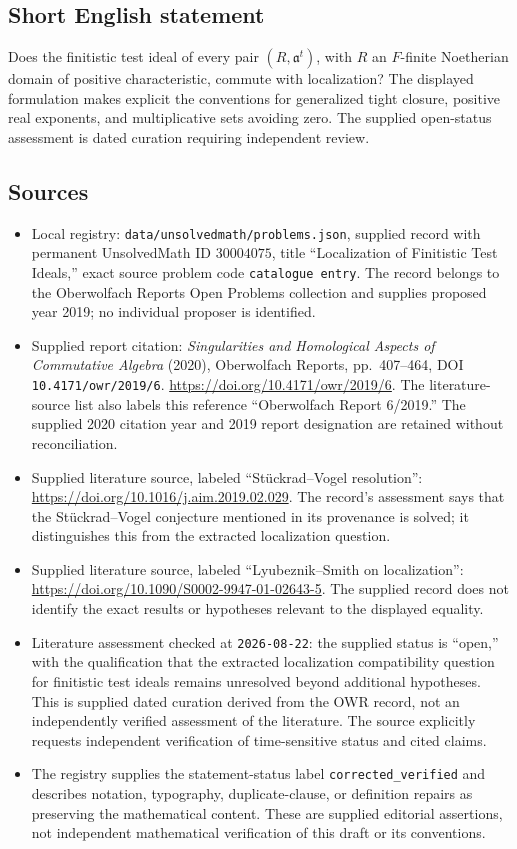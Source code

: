 \documentclass[11pt]{article}
\begin{document}
\subsection{Short English statement}
Does the finitistic test ideal of every pair \((R,\mathfrak a^t)\), with \(R\) an \(F\)-finite Noetherian domain of positive characteristic, commute with localization? The displayed formulation makes explicit the conventions for generalized tight closure, positive real exponents, and multiplicative sets avoiding zero. The supplied open-status assessment is dated curation requiring independent review.
\subsection{Sources}
\begin{itemize}
\item Local registry: \texttt{data/unsolvedmath/problems.json}, supplied record with permanent UnsolvedMath ID \(30004075\), title ``Localization of Finitistic Test Ideals,'' exact source problem code \texttt{catalogue entry}. The record belongs to the Oberwolfach Reports Open Problems collection and supplies proposed year 2019; no individual proposer is identified.
\item Supplied report citation: \emph{Singularities and Homological Aspects of Commutative Algebra} (2020), Oberwolfach Reports, pp.~407--464, DOI \texttt{10.4171/owr/2019/6}. \url{https://doi.org/10.4171/owr/2019/6}. The literature-source list also labels this reference ``Oberwolfach Report 6/2019.'' The supplied 2020 citation year and 2019 report designation are retained without reconciliation.
\item Supplied literature source, labeled ``St\"uckrad--Vogel resolution'': \url{https://doi.org/10.1016/j.aim.2019.02.029}. The record's assessment says that the St\"uckrad--Vogel conjecture mentioned in its provenance is solved; it distinguishes this from the extracted localization question.
\item Supplied literature source, labeled ``Lyubeznik--Smith on localization'': \url{https://doi.org/10.1090/S0002-9947-01-02643-5}. The supplied record does not identify the exact results or hypotheses relevant to the displayed equality.
\item Literature assessment checked at \texttt{2026-08-22}: the supplied status is ``open,'' with the qualification that the extracted localization compatibility question for finitistic test ideals remains unresolved beyond additional hypotheses. This is supplied dated curation derived from the OWR record, not an independently verified assessment of the literature. The source explicitly requests independent verification of time-sensitive status and cited claims.
\item The registry supplies the statement-status label \texttt{corrected\_verified} and describes notation, typography, duplicate-clause, or definition repairs as preserving the mathematical content. These are supplied editorial assertions, not independent mathematical verification of this draft or its conventions.
\end{itemize}
\end{document}
